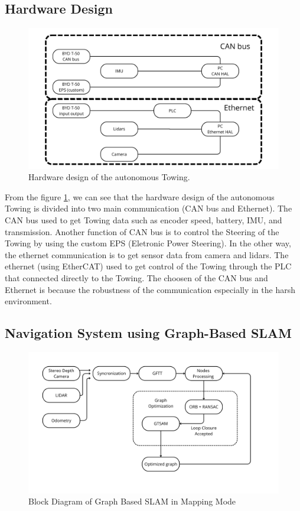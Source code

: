 \documentclass[conference]{IEEEtran}
\begin{document}
\subsection{Hardware Design} 
\begin{figure}[H]
	\centering
	\includegraphics[width=\linewidth]{../konten/ist_hw.png}
	\caption{Hardware design of the autonomous Towing.}
	\label{fig:hw_design}
\end{figure} 

From the figure \ref{fig:hw_design}, we can see that the hardware design of the autonomous Towing is divided into two main communication (CAN bus and Ethernet). The CAN bus used to get Towing data such as encoder speed, battery, IMU, and transmission. Another function of CAN bus is to control the Steering of the Towing by using the custom EPS (Eletronic Power Steering). In the other way, the ethernet communication is to get sensor data from camera and lidars. The ethernet (using EtherCAT) used to get control of the Towing through the PLC that connected directly to the Towing. The choosen of the CAN bus and Ethernet is because the robustness of the communication especially in the harsh environment. 

\subsection{Navigation System using Graph-Based SLAM}
\begin{figure}[H]
	\centering
	\includegraphics[width=\linewidth]{../konten/nav_map2.png}
	\caption{Block Diagram of Graph Based SLAM in Mapping Mode}
	\label{fig:slam_system}
\end{figure} 
\end{document}
